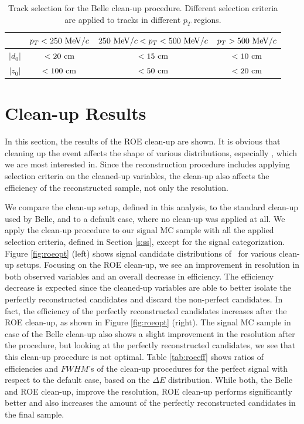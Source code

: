 \begin{table}[H]
	\centering
	\begin{tabular}{c|c|c|c}
		& $p_T < 250\mathrm{~MeV}/c$ & $250\mathrm{~MeV}/c < p_T < 500\mathrm{~MeV}/c$ & $p_T > 500\mathrm{~MeV}/c$ \\
		\toprule
		$\vert d_0 \vert$ & $< 20\mathrm{~cm}$  & $< 15\mathrm{~cm}$ & $< 10\mathrm{~cm}$  \\
		$\vert z_0 \vert$ & $< 100\mathrm{~cm}$  & $< 50\mathrm{~cm}$ & $< 20\mathrm{~cm}$  \\
		\bottomrule
		
	\end{tabular}
	\captionsetup{width=.8\linewidth}
	\caption{Track selection for the Belle clean-up procedure. Different selection criteria are applied to tracks in different $p_T$ regions.}
	\label{tab:belletrack}
\end{table}

\section{Clean-up Results}

In this section, the results of the ROE clean-up are shown. It is obvious that cleaning up the event affects the shape of various distributions, especially \vars, which we are most interested in. Since the reconstruction procedure includes applying selection criteria on the cleaned-up variables, the clean-up also affects the efficiency of the reconstructed sample, not only the resolution. 

We compare the clean-up setup, defined in this analysis, to the standard clean-up used by Belle, and to a default case, where no clean-up was applied at all. We apply the clean-up procedure to our signal MC sample with all the applied selection criteria, defined in Section \ref{s:ss}, except for the signal categorization. Figure \ref{fig:roeopt} (left) shows signal candidate distributions of \vars~for various clean-up setups. Focusing on the ROE clean-up, we see an improvement in resolution in both observed variables and an overall decrease in efficiency. The efficiency decrease is expected since the cleaned-up variables are able to better isolate the perfectly reconstructed candidates and discard the non-perfect candidates. In fact, the efficiency of the perfectly reconstructed candidates increases after the ROE clean-up, as shown in Figure \ref{fig:roeopt} (right). The signal MC sample in case of the Belle clean-up also shows a slight improvement in the resolution after the procedure, but looking at the perfectly reconstructed candidates, we see that this clean-up procedure is not optimal. Table \ref{tab:roeeff} shows ratios of efficiencies and $FWHM$'s of the clean-up procedures for the perfect signal with respect to the default case, based on the $\Delta E$ distribution. While both, the Belle and ROE clean-up, improve the resolution, ROE clean-up performs significantly better and also increases the amount of the perfectly reconstructed candidates in the final sample.

